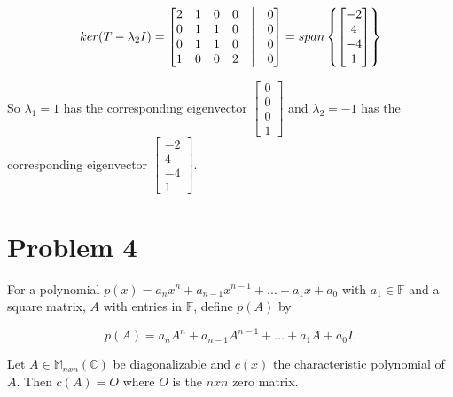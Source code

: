 \documentclass{article}
\begin{document}
\[ ker(T - \lambda_2 I) = \begin{bmatrix} 2 & 1 & 0 & 0 &\bigm| & 0 \\ 0 & 1 & 1 & 0 &\bigm| & 0 \\ 0 & 1 & 1 & 0 &\bigm| & 0 \\ 1 & 0 & 0 & 2 &\bigm| & 0 \end{bmatrix} = span \begin{Bmatrix} \begin{bmatrix} -2 \\ 4 \\ -4 \\ 1 \end{bmatrix} \end{Bmatrix} \]

So $\lambda_1 = 1$ has the corresponding eigenvector $\begin{bmatrix} 0 \\ 0 \\ 0 \\ 1 \end{bmatrix}$ and $\lambda_2 = -1$ has the corresponding eigenvector $\begin{bmatrix} -2 \\ 4 \\ -4 \\ 1 \end{bmatrix}$. 

\section*{Problem 4}
For a polynomial $p(x) = a_nx^n + a_{n-1}x^{n-1}+...+a_1x+a_0$ with $a_1 \in \mathbb{F}$ and a square matrix, $A$ with entries in $\mathbb{F}$, define $p(A)$ by

\[ p(A) = a_nA^n + a_{n-1}A^{n-1}+...+a_1A+a_0I. \]

Let $A \in \mathbb{M}_{nxn}(\mathbb{C})$ be diagonalizable and $c(x)$ the characteristic polynomial of $A$. Then $c(A)=O$ where $O$ is the $nxn$ zero matrix. 
\end{document}
